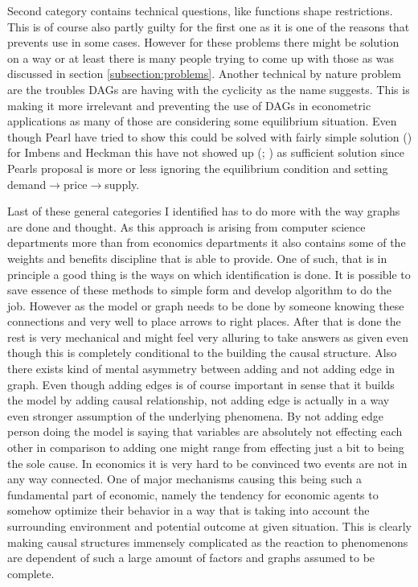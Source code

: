 \documentclass[main=english,12pt,a4paper,pdftex,econ,utf8]{aaltothesis}
\begin{document}
Second category contains technical questions, like functions shape restrictions. This is of course also partly guilty for the first one as it is one of the reasons that prevents use in some cases. However for these problems there might be solution on a way or at least there is many people trying to come up with those as was discussed in section \ref{subsection:problems}. Another technical by nature problem are the troubles DAGs are having with the cyclicity as the name suggests. This is making it more irrelevant and preventing the use of DAGs in econometric applications as many of those are considering some equilibrium situation. Even though Pearl have tried to show this could be solved with fairly simple solution (\cite{PearlMackenzie18}) for Imbens and Heckman this have not showed up (\cite{imbes2020}; \cite{Heckman2015}) as sufficient solution since Pearls proposal is more or less ignoring the equilibrium condition and setting demand$\rightarrow$price$\rightarrow$supply.

Last of these general categories I identified has to do more with the way graphs are done and thought. As this approach is arising from computer science departments more than from economics departments it also contains some of the weights and benefits discipline that is able to provide. One of such, that is in principle a good thing is the ways on which identification is done. It is possible to save essence of these methods to simple form and develop algorithm to do the job. However as the model or graph needs to be done by someone knowing these connections and very well to place arrows to right places. After that is done the rest is very mechanical and might feel very alluring to take answers as given even though this is completely conditional to the building the causal structure. Also there exists kind of mental asymmetry between adding and not adding edge in graph. Even though adding edges is of course important in sense that it builds the model by adding causal relationship, not adding edge is actually in a way even stronger assumption of the underlying phenomena. By not adding edge person doing the model is saying that variables are absolutely not effecting each other in comparison to adding one might range from effecting just a bit to being the sole cause. In economics it is very hard to be convinced two events are not in any way connected. One of major mechanisms causing this being such a fundamental part of economic, namely the tendency for economic agents to somehow optimize their behavior in a way that is taking into account the surrounding environment and potential outcome at given situation. This is clearly making causal structures immensely complicated as the reaction to phenomenons are dependent of such a large amount of factors and graphs assumed to be complete.
\end{document}
